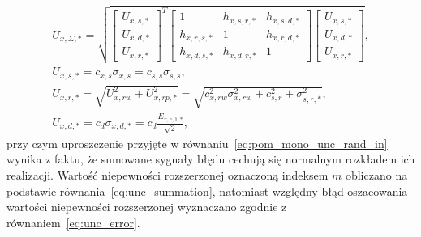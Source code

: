 \begin{gather}
U_{x,\Sigma,*} = \sqrt{
\begin{bmatrix}
U_{x,s,*} \\ U_{x,d,*} \\ U_{x,r,*}
\end{bmatrix}^{T}
\begin{bmatrix}
1           & h_{x,s,r,*} & h_{x,s,d,*} \\
h_{x,r,s,*} &           1 & h_{x,r,d,*} \\
h_{x,d,s,*} & h_{x,d,r,*} &           1
\end{bmatrix}
\begin{bmatrix}
U_{x,s,*} \\ U_{x,d,*} \\ U_{x,r,*}
\end{bmatrix}}
\label{eq:pom_uncx_sum_all}, \\
U_{x,s,*} = c_{x,s} \sigma_{x,s} = c_{s,s} \sigma_{s,s} \label{eq:pom_mono_unc_stat_in}, \\
U_{x,r,*} = \sqrt{U_{x,rw}^{2} + U_{x,rp,*}^{2}} = \sqrt{c_{x,rw}^{2} \sigma_{x,rw}^2 + c_{s,r}^{2} + \sigma_{s,r,*}^{2}} \label{eq:pom_mono_unc_rand_in}, \\
U_{x,d,*} = c_{d} \sigma_{x,d,*} = c_{d} \frac{E_{x,e,1,*}}{\sqrt{2}} \label{eq:pom_mono_unc_dyn_all},
\end{gather}
przy czym uproszczenie przyjęte w równaniu~\eqref{eq:pom_mono_unc_rand_in} wynika z faktu, że sumowane sygnały błędu cechują się normalnym rozkładem ich realizacji. Wartość niepewności rozszerzonej oznaczoną indeksem $m$ obliczano na podstawie równania~\eqref{eq:unc_summation}, natomiast względny błąd oszacowania wartości niepewności rozszerzonej wyznaczano zgodnie z równaniem~\eqref{eq:unc_error}.

